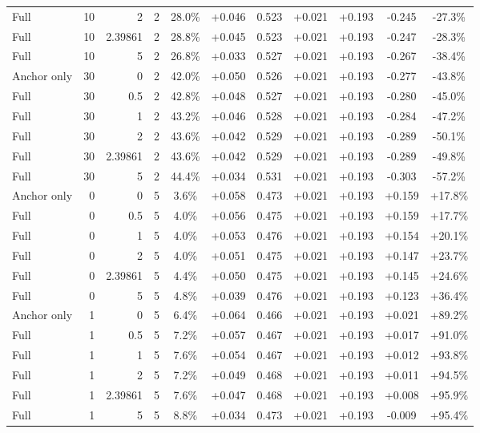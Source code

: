 \begin{table}[htbp]
\begin{tabular}{lrrrccccccc}
Full & 10 & 2 & 2 & 28.0\% & +0.046 & 0.523 & +0.021 & +0.193 & -0.245 & -27.3\% \\
Full & 10 & 2.39861 & 2 & 28.8\% & +0.045 & 0.523 & +0.021 & +0.193 & -0.247 & -28.3\% \\
Full & 10 & 5 & 2 & 26.8\% & +0.033 & 0.527 & +0.021 & +0.193 & -0.267 & -38.4\% \\
Anchor only & 30 & 0 & 2 & 42.0\% & +0.050 & 0.526 & +0.021 & +0.193 & -0.277 & -43.8\% \\
Full & 30 & 0.5 & 2 & 42.8\% & +0.048 & 0.527 & +0.021 & +0.193 & -0.280 & -45.0\% \\
Full & 30 & 1 & 2 & 43.2\% & +0.046 & 0.528 & +0.021 & +0.193 & -0.284 & -47.2\% \\
Full & 30 & 2 & 2 & 43.6\% & +0.042 & 0.529 & +0.021 & +0.193 & -0.289 & -50.1\% \\
Full & 30 & 2.39861 & 2 & 43.6\% & +0.042 & 0.529 & +0.021 & +0.193 & -0.289 & -49.8\% \\
Full & 30 & 5 & 2 & 44.4\% & +0.034 & 0.531 & +0.021 & +0.193 & -0.303 & -57.2\% \\
Anchor only & 0 & 0 & 5 & 3.6\% & +0.058 & 0.473 & +0.021 & +0.193 & +0.159 & +17.8\% \\
Full & 0 & 0.5 & 5 & 4.0\% & +0.056 & 0.475 & +0.021 & +0.193 & +0.159 & +17.7\% \\
Full & 0 & 1 & 5 & 4.0\% & +0.053 & 0.476 & +0.021 & +0.193 & +0.154 & +20.1\% \\
Full & 0 & 2 & 5 & 4.0\% & +0.051 & 0.475 & +0.021 & +0.193 & +0.147 & +23.7\% \\
Full & 0 & 2.39861 & 5 & 4.4\% & +0.050 & 0.475 & +0.021 & +0.193 & +0.145 & +24.6\% \\
Full & 0 & 5 & 5 & 4.8\% & +0.039 & 0.476 & +0.021 & +0.193 & +0.123 & +36.4\% \\
Anchor only & 1 & 0 & 5 & 6.4\% & +0.064 & 0.466 & +0.021 & +0.193 & +0.021 & +89.2\% \\
Full & 1 & 0.5 & 5 & 7.2\% & +0.057 & 0.467 & +0.021 & +0.193 & +0.017 & +91.0\% \\
Full & 1 & 1 & 5 & 7.6\% & +0.054 & 0.467 & +0.021 & +0.193 & +0.012 & +93.8\% \\
Full & 1 & 2 & 5 & 7.2\% & +0.049 & 0.468 & +0.021 & +0.193 & +0.011 & +94.5\% \\
Full & 1 & 2.39861 & 5 & 7.6\% & +0.047 & 0.468 & +0.021 & +0.193 & +0.008 & +95.9\% \\
Full & 1 & 5 & 5 & 8.8\% & +0.034 & 0.473 & +0.021 & +0.193 & -0.009 & +95.4\% \\

\end{tabular}
\end{table}
